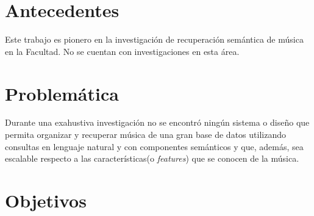 \section{Antecedentes}
\label{sec:anteced}

Este trabajo es pionero en la investigación de recuperación semántica de música en la Facultad. No se cuentan con investigaciones en esta área. 

\section{Problemática}
\label{sec:problem}

Durante una exahustiva investigación no se encontró ningún sistema o diseño que permita organizar y recuperar música de una gran base de datos utilizando consultas en lenguaje natural y con componentes semánticos y que, además, sea escalable respecto a las características(o \textit{features}) que se conocen de la música. \\
\section{Objetivos}
\label{sec:objective}

